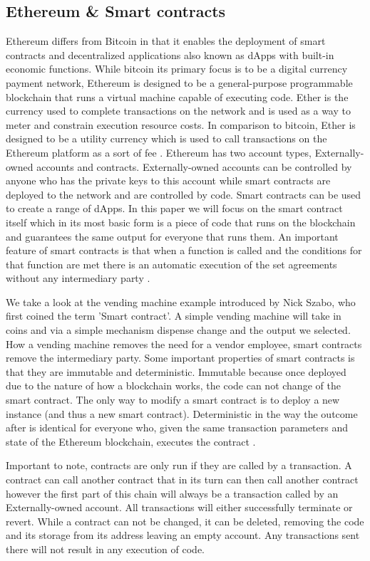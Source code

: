 \documentclass[sigconf]{acmart}
\begin{document}
\subsection{Ethereum \& Smart contracts}
Ethereum differs from Bitcoin in that it enables the deployment of smart contracts and decentralized applications also known as dApps with built-in economic functions. While bitcoin its primary focus is to be a digital currency payment network, Ethereum is designed to be a general-purpose programmable blockchain that runs a virtual machine capable of executing code.
Ether is the currency used to complete transactions on the network and is used as a way to meter and constrain execution resource costs. In comparison to bitcoin, Ether is designed to be a utility currency which is used to call transactions on the Ethereum platform as a sort of fee \cite{mastering}.  Ethereum has two account types, Externally-owned accounts and contracts. Externally-owned accounts can be controlled by anyone who has the private keys to this account while smart contracts are deployed to the network and are controlled by code. Smart contracts can be used to create a range of dApps. In this paper we will focus on the smart contract itself which in its most basic form is a piece of code that runs on the blockchain and guarantees the same output for everyone that runs them. An important feature of smart contracts is that when a function is called and the conditions for that function are met there is an automatic execution of the set agreements without any intermediary party \cite{ethereum} \cite{white_paper}.

We take a look at the vending machine example introduced by Nick Szabo, who first coined the term 'Smart contract'\cite{nick}. A simple vending machine will take in coins and via a simple mechanism dispense change and the output we selected. How a vending machine removes the need for a vendor employee, smart contracts remove the intermediary party. Some important properties of smart contracts is that they are immutable and deterministic. Immutable because once deployed due to the nature of how a blockchain works, the code can not change of the smart contract. The only way to modify a smart contract is to deploy a new instance (and thus a new smart contract). Deterministic in the way the outcome after is identical for everyone who, given the same transaction parameters and state of the Ethereum blockchain, executes the contract \cite{white_paper}.

Important to note, contracts are only run if they are called by a transaction. A contract can call another contract that in its turn can then call another contract however the first part of this chain will always be a transaction called by an Externally-owned account. All transactions will either successfully terminate or revert. While a contract can not be changed, it can be deleted, removing the code and its storage from its address leaving an empty account. Any transactions sent there will not result in any execution of code. 
\end{document}
